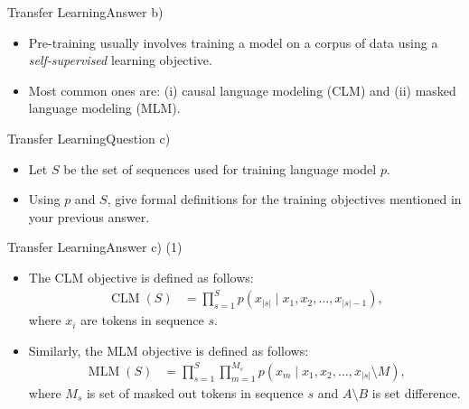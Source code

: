 \documentclass[t]{beamer}
\newcommand\op[1]{\operatorname{#1}}
\begin{document}
\begin{frame}{Transfer Learning}{Answer b)}
    \begin{itemize}
        \item Pre-training usually involves training a model on a corpus of data
              using a \emph{self-supervised} learning objective.
        \item Most common ones are: (i) causal language modeling (CLM) and (ii)
              masked language modeling (MLM).
    \end{itemize}
\end{frame}

\begin{frame}{Transfer Learning}{Question c)}
    \begin{itemize}
        \item Let $S$ be the set of sequences used for training language model
              $p$.
        \item Using $p$ and $S$, give formal definitions for the training
              objectives mentioned in your previous answer.
    \end{itemize}
\end{frame}

\begin{frame}{Transfer Learning}{Answer c) (1)}
    \begin{itemize}
        \item The CLM objective is defined as follows:
              \begin{align}
                  \op{CLM}(S) & = \prod_{s=1}^{S} p(x_{|s|} \mid x_1, x_2, \ldots, x_{|s|-1}),
              \end{align}
              where $x_i$ are tokens in sequence $s$.
        \item Similarly, the MLM objective is defined as follows:
              \begin{align}
                  \op{MLM}(S) & = \prod_{s=1}^{S} \prod_{m=1}^{M_s} p(x_m \mid x_1, x_2, \ldots, x_{|s|} \setminus M),
              \end{align}
              where $M_s$ is set of masked out tokens in sequence $s$ and
              $A \setminus B$ is set difference.
    \end{itemize}
\end{frame}
\end{document}
